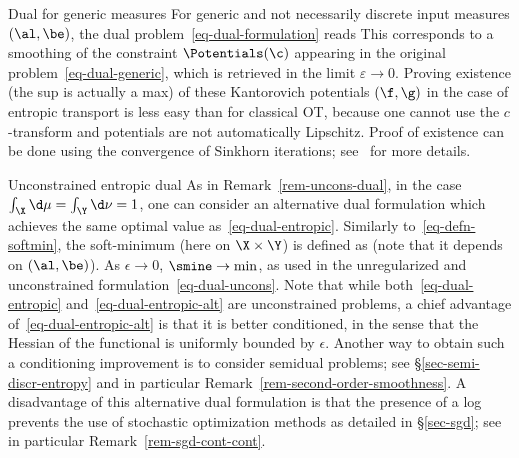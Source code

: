 \begin{rem2}{Dual for generic measures}
For generic and not necessarily discrete input measures $(\al,\be)$, the dual problem~\eqref{eq-dual-formulation} reads
This corresponds to a smoothing of the constraint $\Potentials(\c)$ appearing in the original problem~\eqref{eq-dual-generic}, which is retrieved in the limit $\varepsilon \rightarrow 0$.
%
Proving existence (\ie the sup is actually a max) of these Kantorovich potentials $(\f,\g)$ in the case of entropic transport is less easy than for classical OT, because one cannot use the $c$-transform and potentials are not automatically Lipschitz. Proof of existence can be done using the convergence of Sinkhorn iterations; see~\citep{2016-chizat-sinkhorn} for more details. 
\end{rem2}




\begin{rem2}{Unconstrained entropic dual}
As in Remark~\ref{rem-uncons-dual}, in the case $\int_\X \d\mu=\int_\Y\d\nu = 1$, one can consider an  alternative dual formulation
which achieves the same optimal value as~\eqref{eq-dual-entropic}.
%
Similarly to~\eqref{eq-defn-softmin}, the soft-minimum (here on $\X \times \Y$) is defined as
(note that it depends on $(\al,\be)$).
% 
As $\epsilon \rightarrow 0$, $\smine \rightarrow \min$, as used in the unregularized and unconstrained formulation~\eqref{eq-dual-uncons}.
%
Note that while both~\eqref{eq-dual-entropic} and~\eqref{eq-dual-entropic-alt} are unconstrained problems, 
a chief advantage of~\eqref{eq-dual-entropic-alt} is that it is better conditioned, 
in the sense that the Hessian of the functional is uniformly bounded by $\epsilon$. 
Another way to obtain such a conditioning improvement is to consider semidual problems; 
see \S\ref{sec-semi-discr-entropy} and in particular Remark~\ref{rem-second-order-smoothness}.
% 
A disadvantage of this alternative dual formulation is that the presence of a log prevents the use of stochastic optimization methods as detailed in \S\ref{sec-sgd}; see in particular Remark~\ref{rem-sgd-cont-cont}.
\end{rem2}

